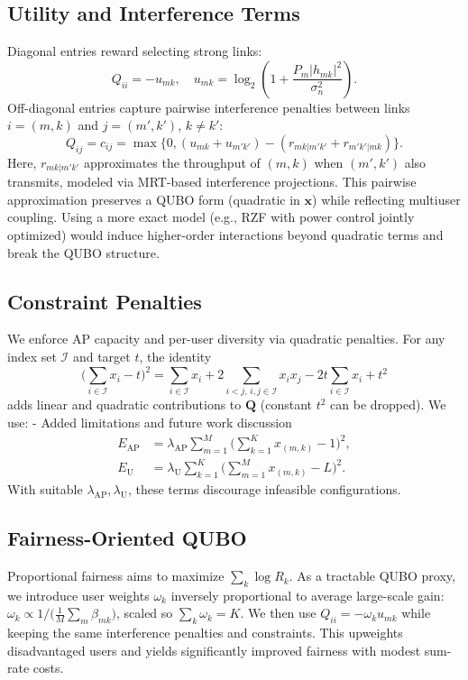 {\subsection{Utility and Interference Terms}
Diagonal entries reward selecting strong links:
\begin{equation}
Q_{ii}=-u_{mk},\quad u_{mk}=\log_2\!\left(1+\frac{P_m|h_{mk}|^2}{\sigma_n^2}\right).
\end{equation}
Off-diagonal entries capture pairwise interference penalties between links $i=(m,k)$ and $j=(m',k')$, $k\neq k'$:
\begin{equation}
Q_{ij}=c_{ij}=\max\!\Big\{0,(u_{mk}+u_{m'k'}) -(r_{mk|m'k'}+r_{m'k'|mk})\Big\}.
\end{equation}
Here, $r_{mk|m'k'}$ approximates the throughput of $(m,k)$ when $(m',k')$ also transmits, modeled via MRT-based interference projections. This pairwise approximation preserves a QUBO form (quadratic in $\mathbf{x}$) while reflecting multiuser coupling. Using a more exact model (e.g., RZF with power control jointly optimized) would induce higher-order interactions beyond quadratic terms and break the QUBO structure.

\subsection{Constraint Penalties}
We enforce AP capacity and per-user diversity via quadratic penalties. For any index set $\mathcal{I}$ and target $t$, the identity
\begin{equation}
\bigg(\sum_{i\in \mathcal{I}} x_i - t\bigg)^2=\sum_{i\in\mathcal{I}}x_i + 2\!\!\sum_{i<j,\,i,j\in\mathcal{I}}\!\! x_ix_j - 2t\sum_{i\in\mathcal{I}}x_i + t^2
\end{equation}
adds linear and quadratic contributions to $\mathbf{Q}$ (constant $t^2$ can be dropped). We use:
- Added limitations and future work discussion
\begin{align}
E_{\text{AP}}&=\lambda_{\text{AP}} \sum_{m=1}^M \Big(\sum_{k=1}^K x_{(m,k)} - 1\Big)^2,\\
E_{\text{U}}&=\lambda_{\text{U}} \sum_{k=1}^K \Big(\sum_{m=1}^M x_{(m,k)} - L\Big)^2.
\end{align}
With suitable $\lambda_{\text{AP}},\lambda_{\text{U}}$, these terms discourage infeasible configurations.

\subsection{Fairness-Oriented QUBO}
Proportional fairness aims to maximize $\sum_k \log R_k$. As a tractable QUBO proxy, we introduce user weights $\omega_k$ inversely proportional to average large-scale gain: $\omega_k \propto 1/\big(\frac{1}{M}\sum_m \beta_{mk}\big)$, scaled so $\sum_k \omega_k=K$. We then use $Q_{ii}=-\omega_k u_{mk}$ while keeping the same interference penalties and constraints. This upweights disadvantaged users and yields significantly improved fairness with modest sum-rate costs.

}
